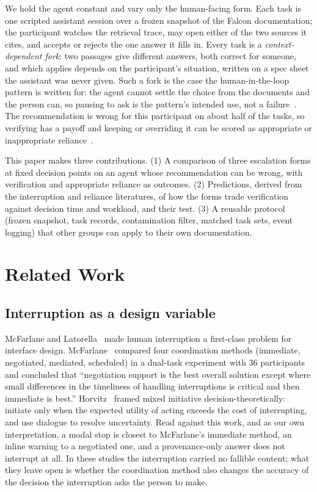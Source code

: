 \documentclass[manuscript,review]{acmart}
\begin{document}
We hold the agent constant and vary only the human-facing form. Each task
is one scripted assistant session over a frozen snapshot of the Falcon
documentation; the participant watches the retrieval trace, may open
either of the two sources it cites, and accepts or rejects the one answer
it fills in. Every task is a \emph{context-dependent fork}: two passages
give different answers, both correct for someone, and which applies
depends on the participant's situation, written on a spec sheet the
assistant was never given. Such a fork is the case the human-in-the-loop
pattern is written for: the agent cannot settle the choice from the
documents and the person can, so pausing to ask is the pattern's intended
use, not a failure~\cite{mishra2026,horvitz1999}. The recommendation is wrong for this
participant on about half of the tasks, so verifying has a payoff and keeping
or overriding it can be scored as appropriate or inappropriate
reliance~\cite{schemmer2023}.

This paper makes three contributions. (1) A comparison of three
escalation forms at fixed decision points on an agent whose recommendation
can be wrong, with verification and appropriate reliance as outcomes. (2)
Predictions, derived from the interruption and reliance literatures, of
how the forms trade verification against decision time and workload, and
their test. (3) A reusable protocol (frozen snapshot, task records,
contamination filter, matched task sets, event logging) that other groups
can apply to their own documentation.

\section{Related Work}
\label{sec:related}

\subsection{Interruption as a design variable}
McFarlane and Latorella~\cite{mcfarlane2002scope} made human interruption
a first-class problem for interface design.
McFarlane~\cite{mcfarlane2002comparison} compared four coordination
methods (immediate, negotiated, mediated, scheduled) in a dual-task
experiment with 36 participants and concluded that ``negotiation support
is the best overall solution except where small differences in the
timeliness of handling interruptions is critical and then immediate is
best.''
Horvitz~\cite{horvitz1999} framed mixed initiative decision-theoretically:
initiate only when the expected utility of acting exceeds the cost of
interrupting, and use dialogue to resolve uncertainty. Read against this
work, and as our own interpretation, a modal stop is closest to
McFarlane's immediate method, an inline warning to a negotiated one, and a
provenance-only answer does not interrupt at all. In these studies the
interruption carried no fallible content; what they leave open is whether
the coordination method also changes the accuracy of the decision the
interruption asks the person to make.
\end{document}
